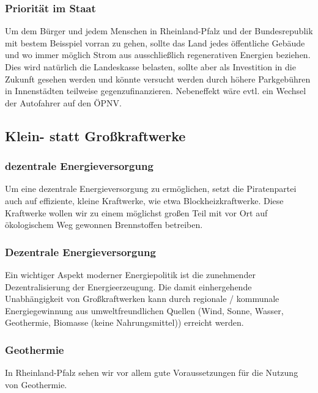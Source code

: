 
\subsubsection{Priorität im Staat}
\abstimmung
Um dem Bürger und jedem Menschen in Rheinland-Pfalz und der Bundesrepublik mit bestem Beisspiel vorran zu gehen, sollte das Land jedes öffentliche Gebäude und wo immer möglich Strom aus ausschließlich regenerativen Energien beziehen. Dies wird natürlich die Landeskasse belasten, sollte aber als Investition in die Zukunft gesehen werden und könnte versucht werden durch höhere Parkgebühren in Innenstädten teilweise gegenzufinanzieren. Nebeneffekt wäre evtl. ein Wechsel der Autofahrer auf den ÖPNV.
 
\subsection*{Klein- statt Großkraftwerke}

\subsubsection{dezentrale Energieversorgung}
\abstimmung
Um eine dezentrale Energieversorgung zu ermöglichen, setzt die Piratenpartei auch auf effiziente, kleine Kraftwerke, wie etwa Blockheizkraftwerke. Diese Kraftwerke wollen wir zu einem möglichst großen Teil mit vor Ort auf ökologischem Weg gewonnen Brennstoffen betreiben.
 

\subsubsection{Dezentrale Energieversorgung}
\abstimmung
Ein wichtiger Aspekt moderner Energiepolitik ist die zunehmender Dezentralisierung der Energieerzeugung. Die damit einhergehende Unabhängigkeit von Großkraftwerken kann durch regionale / kommunale Energiegewinnung aus umweltfreundlichen Quellen (Wind, Sonne, Wasser, Geothermie, Biomasse (keine Nahrungsmittel)) erreicht werden.
\subsubsection{Geothermie}
\abstimmung
In Rheinland-Pfalz sehen wir vor allem gute Voraussetzungen für die Nutzung von Geothermie.

